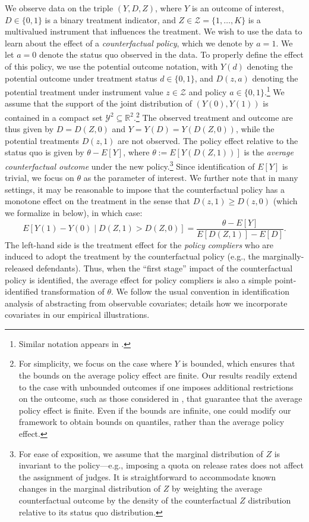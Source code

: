\documentclass[12pt]{article}%
\theoremstyle{definition}
\newcommand\1{\operatorname{I}\indicatorfence}
\begin{document}
We observe data on the triple $(Y, D, Z)$, where $Y$ is an outcome of interest,
$D\in \{0,1\}$ is a binary treatment indicator, and
$Z\in\mathcal{Z} = \{1, \dotsc, K\}$ is a multivalued instrument that influences
the treatment. We wish to use the data to learn about the effect of a
\emph{counterfactual policy}, which we denote by $a=1$. We let $a=0$ denote the
status quo observed in the data. To properly define the effect of this policy,
we use the potential outcome notation, with $Y(d)$ denoting the potential
outcome under treatment status $d\in\{0,1\}$, and $D(z, a)$ denoting the
potential treatment under instrument value $z\in\mathcal{Z}$ and policy
$a\in\{0,1\}$.\footnote{Similar notation appears in \textcite{IcTa00}.} We assume that the support of the joint distribution of $(Y(0), Y(1))$ is
contained in a compact set $\mathcal{Y}^{2} \subseteq \mathbb{R}^{2}$.\footnote{For simplicity, we focus on the case where $Y$ is bounded, which ensures that the bounds on the average policy effect are finite. Our results readily extend to the case with unbounded outcomes if one imposes additional restrictions on the outcome, such as those considered in , that guarantee that the average policy effect is finite. Even if the bounds are infinite, one could modify our framework to obtain bounds on quantiles, rather than the average policy effect.} The
observed treatment and outcome are thus given by $D=D(Z,0)$ and
$Y=Y(D)=Y(D(Z,0))$, while the potential treatments $D(z,1)$ are not observed.
The policy effect relative to the status quo is given by $\theta-E[Y]$, where
$\theta:=E[Y(D(Z,1))]$ is the \emph{average counterfactual outcome} under the
new policy.\footnote{For ease of exposition, we assume that the marginal
  distribution of $Z$ is invariant to the policy---e.g., imposing a quota on
  release rates does not affect the assignment of judges. It is straightforward
  to accommodate known changes in the marginal distribution of $Z$ by weighting
  the average counterfactual outcome by the density of the counterfactual $Z$
  distribution relative to its status quo distribution.} Since identification of
$E[Y]$ is trivial, we focus on $\theta$ as the parameter of interest. We further note that in many settings, it may be reasonable to impose that the counterfactual policy has a monotone effect on the treatment in the sense that $D(z,1) \geq D(z,0)$ (which we formalize in  below), in which case:
\begin{equation}\label{eq:complier_effect}
 E[Y(1) - Y(0) \mid D(Z,1) > D(Z,0)] = \frac{\theta - E[Y]}{E[D(Z,1)] - E[D]}.
\end{equation}
The left-hand side is the treatment effect for the \emph{policy compliers} who
are induced to adopt the treatment by the counterfactual policy (e.g., the
marginally-released defendants). Thus, when the ``first stage'' impact of the
counterfactual policy is identified, the average effect for policy compliers is
also a simple point-identified transformation of $\theta$. We follow the usual
convention in identification analysis of abstracting from observable covariates;
 details how we incorporate covariates in our empirical
illustrations.
\end{document}
